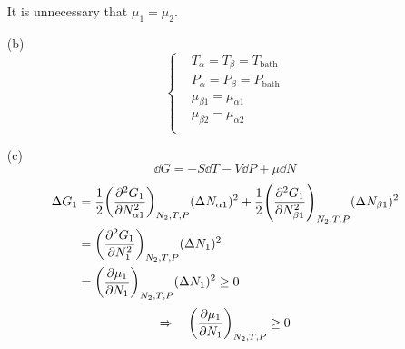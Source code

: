 \documentclass{article}
\begin{document}
\begin{enumerate}
        It is unnecessary that $\mu_1=\mu_2$.
        \item[(b)]
        $$\left\{\begin{aligned}
            &T_\alpha=T_\beta=T_{\text{bath}}\\
            &P_\alpha=P_\beta=P_{\text{bath}}\\
            &\mu_{\beta 1}=\mu_{\alpha 1}\\
            &\mu_{\beta 2}=\mu_{\alpha 2}\\
        \end{aligned}\right.$$
        \item[(c)]
        $$\dd{G}=-S\dd{T}-V\dd{P}+\mu\dd{N}$$
        \begin{align*}
            \Delta G_1&=\frac{1}{2}\qty(\pdv[2]{G_1}{N_{\alpha 1}})_{N_2,T,P}(\Delta N_{\alpha 1})^2+\frac{1}{2}\qty(\pdv[2]{G_1}{N_{\beta 1}})_{N_2,T,P}(\Delta N_{\beta 1})^2\\
            &=\qty(\pdv[2]{G_1}{N_1})_{N_2,T,P}(\Delta N_1)^2\\
            &=\qty(\pdv{\mu_1}{N_1})_{N_2,T,P}(\Delta N_1)^2\ge 0
        \end{align*}
        $$\Rightarrow\quad\qty(\pdv{\mu_1}{N_1})_{N_2,T,P}\ge 0$$
    \end{enumerate}
\end{document}
